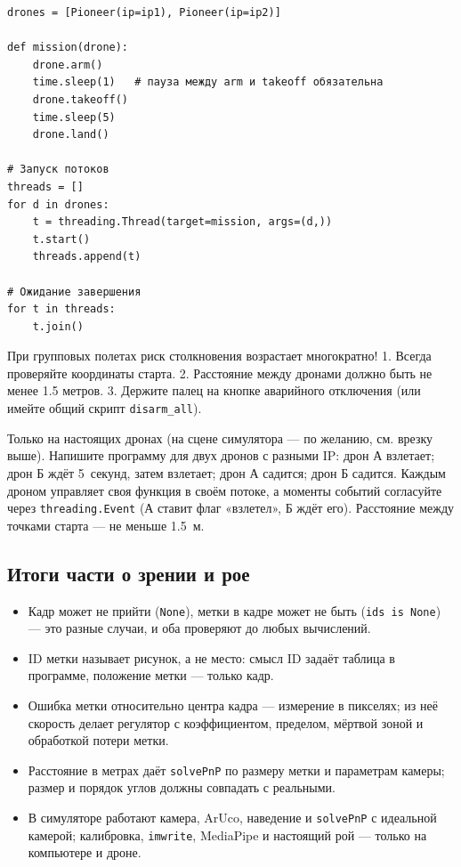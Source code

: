 \begin{codebox}
\begin{verbatim}
drones = [Pioneer(ip=ip1), Pioneer(ip=ip2)]

def mission(drone):
    drone.arm()
    time.sleep(1)   # пауза между arm и takeoff обязательна
    drone.takeoff()
    time.sleep(5)
    drone.land()

# Запуск потоков
threads = []
for d in drones:
    t = threading.Thread(target=mission, args=(d,))
    t.start()
    threads.append(t)

# Ожидание завершения
for t in threads:
    t.join()
\end{verbatim}
\end{codebox}

\begin{warnbox}
При групповых полетах риск столкновения возрастает многократно!
1. Всегда проверяйте координаты старта.
2. Расстояние между дронами должно быть не менее 1.5 метров.
3. Держите палец на кнопке аварийного отключения (или имейте общий скрипт \texttt{disarm\_all}).
\end{warnbox}

\begin{taskbox}[Танец]
Только на настоящих дронах (на сцене симулятора --- по желанию, см. врезку выше). Напишите программу для двух дронов с разными IP: дрон А взлетает; дрон Б ждёт 5~секунд, затем взлетает; дрон А садится; дрон Б садится. Каждым дроном управляет своя функция в своём потоке, а моменты событий согласуйте через \verb|threading.Event| (А ставит флаг «взлетел», Б ждёт его). Расстояние между точками старта --- не меньше 1.5~м.
\end{taskbox}

\subsection*{Итоги части о зрении и рое}
\begin{itemize}
    \item Кадр может не прийти (\verb|None|), метки в кадре может не быть (\verb|ids is None|) --- это разные случаи, и оба проверяют до любых вычислений.
    \item ID метки называет рисунок, а не место: смысл ID задаёт таблица в программе, положение метки --- только кадр.
    \item Ошибка метки относительно центра кадра --- измерение в пикселях; из неё скорость делает регулятор с коэффициентом, пределом, мёртвой зоной и обработкой потери метки.
    \item Расстояние в метрах даёт \verb|solvePnP| по размеру метки и параметрам камеры; размер и порядок углов должны совпадать с реальными.
    \item В симуляторе работают камера, ArUco, наведение и \verb|solvePnP| с идеальной камерой; калибровка, \verb|imwrite|, MediaPipe и настоящий рой --- только на компьютере и дроне.
\end{itemize}

